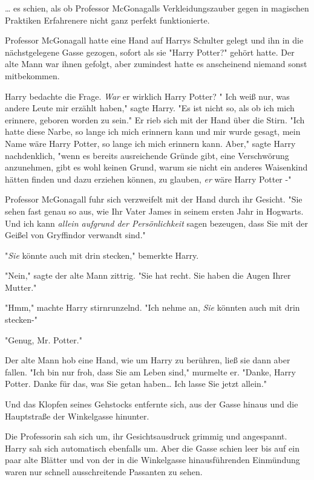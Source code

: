 {… es schien, als ob Professor McGonagalls Verkleidungszauber gegen in magischen Praktiken Erfahrenere nicht ganz perfekt funktionierte.

Professor McGonagall hatte eine Hand auf Harrys Schulter gelegt und ihn in die nächstgelegene Gasse gezogen, sofort als sie "Harry Potter?" gehört hatte. Der alte Mann war ihnen gefolgt, aber zumindest hatte es anscheinend niemand sonst mitbekommen.

Harry bedachte die Frage. \emph{War} er wirklich Harry Potter? " Ich weiß nur, was andere Leute mir erzählt haben," sagte Harry. "Es ist nicht so, als ob ich mich erinnere, geboren worden zu sein." Er rieb sich mit der Hand über die Stirn. "Ich hatte diese Narbe, so lange ich mich erinnern kann und mir wurde gesagt, mein Name wäre Harry Potter, so lange ich mich erinnern kann. Aber," sagte Harry nachdenklich, "wenn es bereits ausreichende Gründe gibt, eine Verschwörung anzunehmen, gibt es wohl keinen Grund, warum sie nicht ein anderes Waisenkind hätten finden und dazu erziehen können, zu glauben, \emph{er} wäre Harry Potter -"

Professor McGonagall fuhr sich verzweifelt mit der Hand durch ihr Gesicht. "Sie sehen fast genau so aus, wie Ihr Vater James in seinem ersten Jahr in Hogwarts. Und ich kann \emph{allein aufgrund der Persönlichkeit} sagen bezeugen, dass Sie mit der Geißel von Gryffindor verwandt sind."

"\emph{Sie} könnte auch mit drin stecken," bemerkte Harry.

"Nein," sagte der alte Mann zittrig. "Sie hat recht. Sie haben die Augen Ihrer Mutter."

"Hmm," machte Harry stirnrunzelnd. "Ich nehme an, \emph{Sie} könnten auch mit drin stecken-"

"Genug, Mr. Potter."

Der alte Mann hob eine Hand, wie um Harry zu berühren, ließ sie dann aber fallen. "Ich bin nur froh, dass Sie am Leben sind," murmelte er. "Danke, Harry Potter. Danke für das, was Sie getan haben… Ich lasse Sie jetzt allein."

Und das Klopfen seines Gehstocks entfernte sich, aus der Gasse hinaus und die Hauptstraße der Winkelgasse hinunter.

Die Professorin sah sich um, ihr Gesichtsausdruck grimmig und angespannt. Harry sah sich automatisch ebenfalls um. Aber die Gasse schien leer bis auf ein paar alte Blätter und von der in die Winkelgasse hinausführenden Einmündung waren nur schnell ausschreitende Passanten zu sehen.

}
